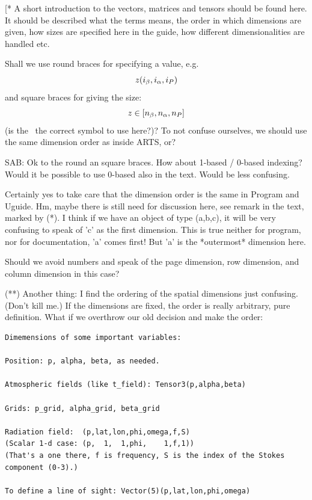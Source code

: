 \label{sec:fm_defs:math}

[* A short introduction to the vectors, matrices and tensors should be
found here. It should be described what the terms means, the order in
which dimensions are given, how sizes are specified here in the guide,
how different dimensionalities are handled etc. 

Shall we use round braces for specifying a value, e.g.
\begin{equation}
  z(i_{\beta},i_{\alpha},i_{P})
\end{equation}
and square braces for giving the size:
\begin{equation}
  z \in [n_{\beta},n_{\alpha},n_{P}]
\end{equation}
(is the \SzeSmb\ the correct symbol to use here?)? To not confuse
ourselves, we should use the same dimension order as inside ARTS, or? 

SAB: Ok to the round an square braces. How about 1-based / 0-based
indexing? Would it be possible to use 0-based also in the text. Would
be less confusing.

Certainly yes to take care that the dimension order is the same in
Program and Uguide. Hm, maybe there is still need for discussion here,
see remark in the text, marked by (*). I think if we have an object of
type (a,b,c), it will be very confusing to speak of 'c' as the first
dimension. This is true neither for program, nor for documentation,
'a' comes first! But 'a' is the *outermost* dimension here.

Should we avoid numbers and speak of the page dimension, row
dimension, and column dimension in this case? 

(**) Another thing: I find the ordering of the spatial dimensions just
confusing. (Don't kill me.) If the dimensions are fixed, the order is
really arbitrary, pure definition.  What if we overthrow our old
decision and make the order:

\begin{verbatim}
Dimemensions of some important variables:

Position: p, alpha, beta, as needed.

Atmospheric fields (like t_field): Tensor3(p,alpha,beta)

Grids: p_grid, alpha_grid, beta_grid

Radiation field:  (p,lat,lon,phi,omega,f,S)
(Scalar 1-d case: (p,  1,  1,phi,    1,f,1))
(That's a one there, f is frequency, S is the index of the Stokes
component (0-3).)

To define a line of sight: Vector(5)(p,lat,lon,phi,omega)
\end{verbatim}

